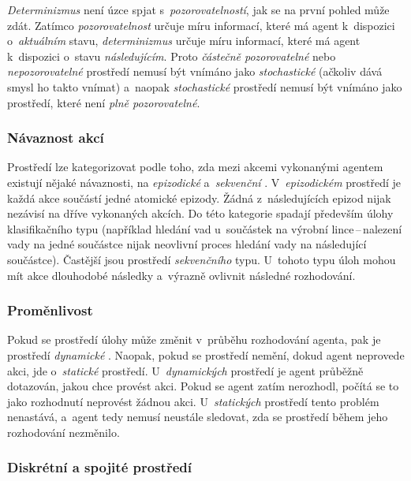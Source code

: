 \emph{Determinizmus} není úzce spjat s~\emph{pozorovatelností}, jak se na první pohled může zdát. Zatímco \emph{pozorovatelnost} určuje míru informací, které má agent k~dispozici o~\emph{aktuálním} stavu, \emph{determinizmus} určuje míru informací, které má agent k~dispozici o~stavu \emph{následujícím}. Proto \emph{částečně pozorovatelné} nebo \emph{nepozorovatelné} prostředí nemusí být vnímáno jako \emph{stochastické} (ačkoliv dává smysl ho takto vnímat) a~naopak \emph{stochastické} prostředí nemusí být vnímáno jako prostředí, které není \emph{plně pozorovatelné}.

\subsubsection*{Návaznost akcí}

Prostředí lze kategorizovat podle toho, zda mezi akcemi vykonanými agentem existují nějaké návaznosti, na \emph{epizodické} a~\emph{sekvenční} \cite{AI_Russel_Norvig}. V~\emph{epizodickém} prostředí je každá akce součástí jedné atomické epizody. Žádná z~následujících epizod nijak nezávisí na dříve vykonaných akcích. Do této kategorie spadají především úlohy klasifikačního typu (například hledání vad u~součástek na výrobní lince\,--\,nalezení vady na jedné součástce nijak neovlivní proces hledání vady na následující součástce). Častější jsou prostředí \emph{sekvenčního} typu. U~tohoto typu úloh mohou mít akce dlouhodobé následky a~výrazně ovlivnit následné rozhodování.

\subsubsection*{Proměnlivost}

Pokud se prostředí úlohy může změnit v~průběhu rozhodování agenta, pak je prostředí \emph{dynamické} \cite{AI_Russel_Norvig}. Naopak, pokud se prostředí nemění, dokud agent neprovede akci, jde o~\emph{statické} prostředí. U~\emph{dynamických} prostředí je agent průběžně dotazován, jakou chce provést akci. Pokud se agent zatím nerozhodl, počítá se to jako rozhodnutí neprovést žádnou akci. U~\emph{statických} prostředí tento problém nenastává, a~agent tedy nemusí neustále sledovat, zda se prostředí během jeho rozhodování nezměnilo.

\subsubsection*{Diskrétní a spojité prostředí}

